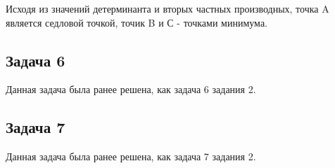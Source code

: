 \documentclass[a4paper,11pt]{article}
\begin{document}
Исходя из значений детерминанта и вторых частных производных, точка A является седловой точкой, точик B и С - точками минимума.

\subsection{Задача 6}

Данная задача была ранее решена, как задача 6 задания 2.

\subsection{Задача 7}

Данная задача была ранее решена, как задача 7 задания 2.
\end{document}

